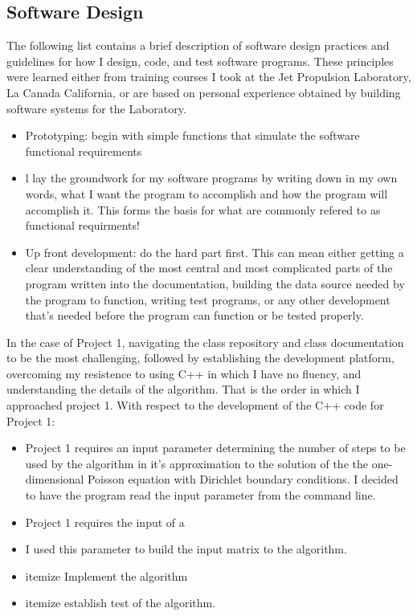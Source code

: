 \documentclass[11pt, oneside]{article}   	%
\begin{document}
\subsection{Software Design}
The following list contains a brief description of software design practices and guidelines for how I design, code, and test software programs. These principles were learned either from training courses I took at the Jet Propulsion Laboratory, La Canada California, or are based on personal experience obtained by building software systems for the Laboratory.
\begin{itemize}
\item Prototyping: begin with simple functions that simulate the software functional requirements
\item l lay the groundwork for my software programs by writing down in my own words, what I want the program to accomplish and how the program will accomplish it. This forms the basis for what are commonly refered to as functional requirments!
\item Up front development: do the hard part first. This can mean either getting a clear understanding of the most central and most complicated parts of the program written into the documentation, building the data source needed by the program to function,  writing test programs, or any other development that's needed before the program can function or be tested properly.
\end{itemize}
In the case of Project 1, navigating the class repository and class documentation to be the most challenging, followed by establishing the development platform, overcoming my resistence to using C++ in which I have no fluency, and understanding the details of the algorithm. That is the order in which I approached project 1. \newline
With respect to the development of the C++ code for Project 1:
\begin{itemize}
\item Project 1 requires an input parameter determining the number of steps to be used by the algorithm in it's approximation  to the solution of the the one-dimensional Poisson equation with Dirichlet boundary conditions. I decided to have the program read the input parameter from the command line.
\item Project 1 requires the input of a 
\item I used this parameter to build the input matrix to the algorithm.
\item{itemize} Implement the algorithm
\item{itemize} establish test of the algorithm.
\end{itemize}
\end{document}
